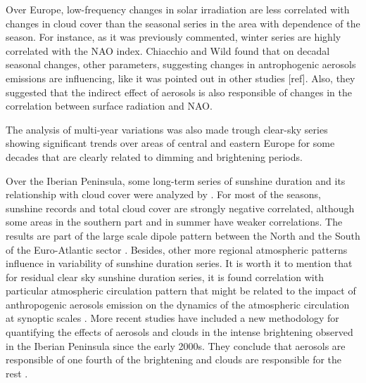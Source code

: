 
Over Europe, low-frequency changes in solar irradiation are less correlated with changes in cloud cover than the seasonal series in the area \cite*{Sanchez-Lorenzo2009, Chiacchio2010} with dependence of the season. For instance, as it was previously commented, winter series are highly correlated with the NAO index. Chiacchio and Wild \cite*{Chiacchio2010} found that on decadal seasonal changes, other parameters, suggesting changes in antrophogenic aerosols emissions are influencing, like it was pointed out in other studies [ref]. Also, they suggested that the indirect effect of aerosols is also responsible of changes in the correlation between surface radiation and NAO.

The analysis of multi-year variations was also made trough clear-sky series showing significant trends over areas of central and eastern Europe for some decades that are clearly related to dimming and brightening periods.


Over the Iberian Peninsula, some long-term series of sunshine duration and its relationship with cloud cover were analyzed by \cite*{Sanchez-Lorenzo2009}. For most of the seasons, sunshine records and total cloud cover are strongly negative correlated, although some areas in the southern part and in summer have weaker correlations. The results are part of the large scale dipole pattern between the North and the South of the Euro-Atlantic sector \cite*{Pozo-Vazquez2004}. Besides, other more regional atmospheric patterns influence in variability of sunshine duration series. It is worth it to mention that for residual clear sky sunshine duration series, it is found correlation with particular atmospheric circulation pattern that might be related to the impact of anthropogenic aerosols emission on the dynamics of the atmospheric circulation at synoptic scales \cite{Sanchez-Lorenzo2009}. More recent studies have included a new methodology for quantifying the effects of aerosols and clouds in the intense brightening observed in the Iberian Peninsula since the early 2000s. They conclude that aerosols are responsible of one fourth of the brightening and clouds are responsible for the rest \cite*{Mateos2014}. %


